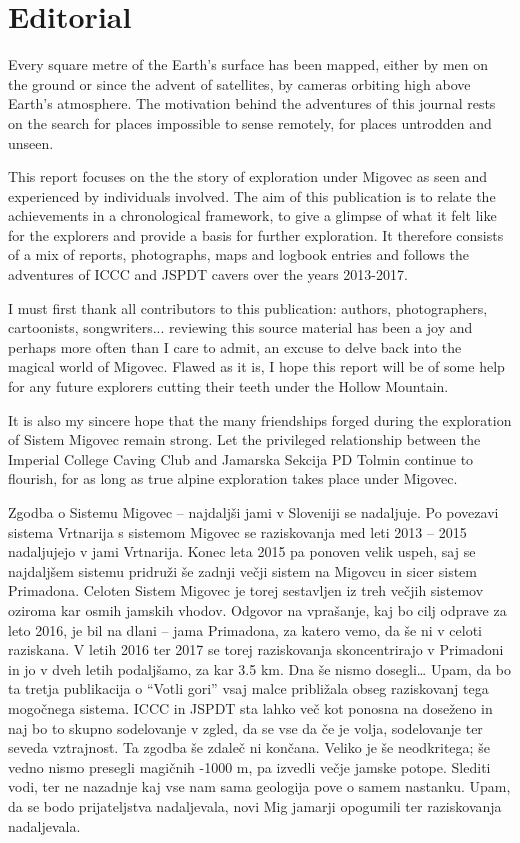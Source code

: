 \chapter*{Editorial}

Every square metre of the Earth's surface has been mapped, either by men on the ground or since the advent of satellites, by cameras orbiting high above Earth's atmosphere. The motivation behind the adventures of this journal rests on the search for places impossible to sense remotely, for places untrodden and unseen.

This report focuses on the the story of exploration under Migovec as seen and experienced by individuals involved. The aim of this publication is to relate the achievements in a chronological framework, to give a glimpse of what it felt like for the explorers and provide a basis for further exploration. It therefore consists of a mix of reports, photographs, maps and logbook entries and follows the adventures of ICCC and JSPDT cavers over the years 2013-2017.

I must first thank all contributors to this publication: authors, photographers, cartoonists, songwriters... reviewing this source material has been a joy and perhaps more often than I care to admit, an excuse to delve back into the magical world of Migovec. Flawed as it is, I hope this report will be of some help for any future explorers cutting their teeth under the Hollow Mountain. 

It is also my sincere hope that the many friendships forged during the exploration of Sistem Migovec remain strong. Let the privileged relationship between the Imperial College Caving Club and Jamarska Sekcija PD Tolmin continue to flourish, for as long as true  alpine exploration takes place under Migovec.



Zgodba o Sistemu Migovec – najdaljši jami v Sloveniji se nadaljuje. Po povezavi sistema Vrtnarija s sistemom Migovec se raziskovanja med leti 2013 – 2015 nadaljujejo v jami Vrtnarija. Konec leta 2015 pa ponoven velik uspeh, saj se najdaljšem sistemu pridruži še zadnji večji sistem na Migovcu in sicer sistem Primadona. Celoten Sistem Migovec je torej sestavljen iz treh večjih sistemov oziroma kar osmih jamskih vhodov. Odgovor na vprašanje, kaj bo cilj odprave za leto 2016, je bil na dlani – jama Primadona, za katero vemo, da še ni v celoti raziskana. V letih 2016 ter 2017 se torej  raziskovanja skoncentrirajo v Primadoni in jo v dveh letih podaljšamo, za kar 3.5 km. Dna še nismo dosegli…
Upam, da bo ta tretja publikacija o “Votli gori” vsaj malce približala obseg raziskovanj tega mogočnega sistema. 
ICCC in JSPDT sta lahko več kot ponosna na doseženo in naj bo to skupno sodelovanje v zgled, da se vse da če je volja, sodelovanje ter seveda vztrajnost. 
Ta zgodba še zdaleč ni končana. Veliko je še neodkritega; še vedno nismo presegli magičnih -1000 m, pa izvedli večje jamske potope. Slediti vodi, ter ne nazadnje kaj vse nam sama geologija pove o samem nastanku.  
Upam, da se bodo prijateljstva nadaljevala, novi Mig jamarji opogumili ter raziskovanja nadaljevala. 

